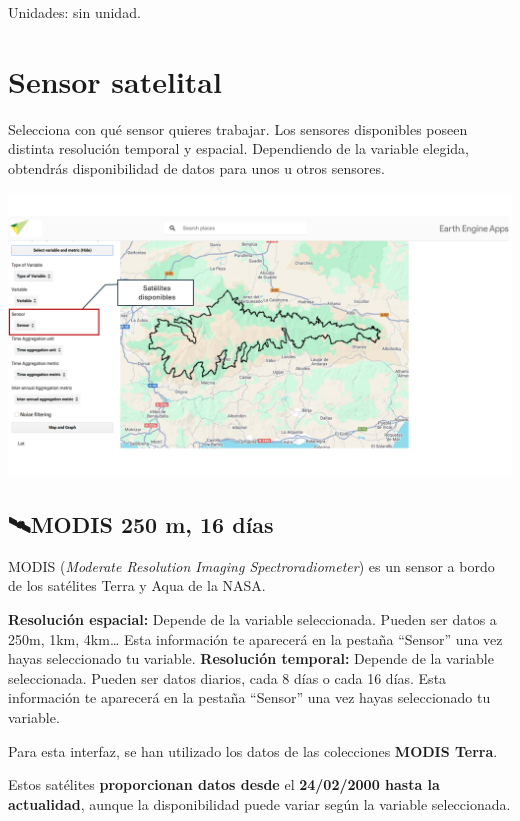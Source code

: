 \documentclass[
]{book}
\begin{document}
Unidades: sin unidad.

\chapter{Sensor satelital}\label{sensor}

Selecciona con qué sensor quieres trabajar. Los sensores disponibles poseen distinta resolución temporal y espacial. Dependiendo de la variable elegida, obtendrás disponibilidad de datos para unos u otros sensores.

\includegraphics{assets/sensor_es.png}

\section{\texorpdfstring{\textbf{🛰️MODIS 250 m, 16 días}}{🛰️MODIS 250 m, 16 días}}\label{modis-250-m-16-duxedas}

MODIS (\emph{Moderate Resolution Imaging Spectroradiometer}) es un sensor a bordo de los satélites Terra y Aqua de la NASA.

\textbf{Resolución espacial:} Depende de la variable seleccionada. Pueden ser datos a 250m, 1km, 4km\ldots{} Esta información te aparecerá en la pestaña ``Sensor'' una vez hayas seleccionado tu variable.
\textbf{Resolución temporal:} Depende de la variable seleccionada. Pueden ser datos diarios, cada 8 días o cada 16 días. Esta información te aparecerá en la pestaña ``Sensor'' una vez hayas seleccionado tu variable.

Para esta interfaz, se han utilizado los datos de las colecciones \textbf{MODIS Terra}.

Estos satélites \textbf{proporcionan datos desde} el \textbf{24/02/2000 hasta la actualidad}, aunque la disponibilidad puede variar según la variable seleccionada.
\end{document}
